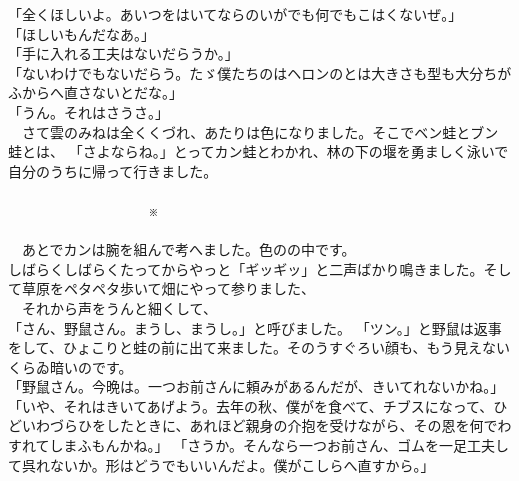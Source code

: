 \documentclass[
a4paper,
fontsize=20pt,
jafontsize=20pt,
book]
{tarticle}
\begin{document}
「全くほしいよ。あいつをはいてならのいがでも何でもこはくないぜ。」\\
「ほしいもんだなあ。」\\
「手に入れる工夫はないだらうか。」\\
「ないわけでもないだらう。たゞ僕たちのはヘロンのとは大きさも型も大分ちがふからへ直さないとだな。」\\
「うん。それはさうさ。」\\
　さて雲のみねは全くくづれ、あたりは色になりました。そこでベン蛙とブン蛙とは、
「さよならね。」とってカン蛙とわかれ、林の下の堰を勇ましく泳いで自分のうちに帰って行きました。\\
\\
　　　　　　　　　　※\\
\\
　あとでカンは腕を組んで考へました。色のの中です。\\
しばらくしばらくたってからやっと「ギッギッ」と二声ばかり鳴きました。そして草原をペタペタ歩いて畑にやって参りました、\\
　それから声をうんと細くして、\\
「さん、野鼠さん。まうし、まうし。」と呼びました。
「ツン。」と野鼠は返事をして、ひょこりと蛙の前に出て来ました。そのうすぐろい顔も、もう見えないくらゐ暗いのです。\\
「野鼠さん。今晩は。一つお前さんに頼みがあるんだが、きいてれないかね。」\\
「いや、それはきいてあげよう。去年の秋、僕がを食べて、チブスになって、ひどいわづらひをしたときに、あれほど親身の介抱を受けながら、その恩を何でわすれてしまふもんかね。」
「さうか。そんなら一つお前さん、ゴムを一足工夫して呉れないか。形はどうでもいいんだよ。僕がこしらへ直すから。」\\
\end{document}
